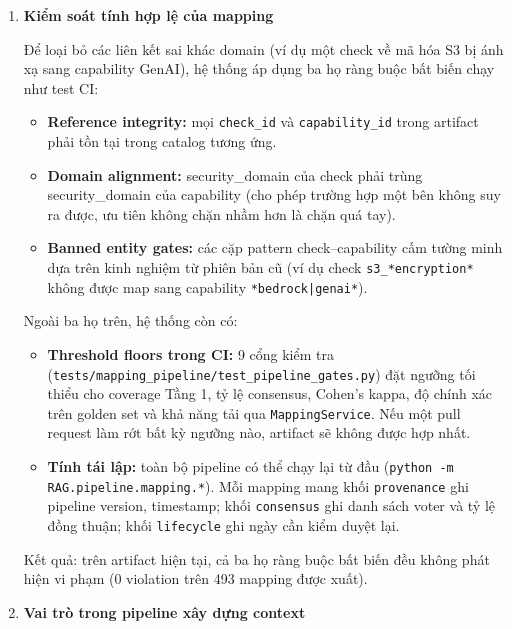 \begin{enumerate}
    Trong trường hợp tồn tại nhiều mapping, hệ thống có thể giữ lại một tập các ứng viên thay vì chỉ chọn một kết quả duy nhất, nhằm phục vụ các bước xây dựng ngữ cảnh phía sau.

    \item \textbf{Kiểm soát tính hợp lệ của mapping}

    Để loại bỏ các liên kết sai khác domain (ví dụ một check về mã hóa S3 bị ánh xạ sang capability GenAI), hệ thống áp dụng ba họ ràng buộc bất biến chạy như test CI:
    \begin{itemize}
        \item \textbf{Reference integrity:} mọi \texttt{check\_id} và \texttt{capability\_id} trong artifact phải tồn tại trong catalog tương ứng.
        \item \textbf{Domain alignment:} security\_domain của check phải trùng security\_domain của capability (cho phép trường hợp một bên không suy ra được, ưu tiên không chặn nhầm hơn là chặn quá tay).
        \item \textbf{Banned entity gates:} các cặp pattern check--capability cấm tường minh dựa trên kinh nghiệm từ phiên bản cũ (ví dụ check \texttt{s3\_*encryption*} không được map sang capability \texttt{*bedrock|genai*}).
    \end{itemize}

    Ngoài ba họ trên, hệ thống còn có:
    \begin{itemize}
        \item \textbf{Threshold floors trong CI:} 9 cổng kiểm tra (\texttt{tests/mapping\_pipeline/test\_pipeline\_gates.py}) đặt ngưỡng tối thiểu cho coverage Tầng 1, tỷ lệ consensus, Cohen's kappa, độ chính xác trên golden set và khả năng tải qua \texttt{MappingService}. Nếu một pull request làm rớt bất kỳ ngưỡng nào, artifact sẽ không được hợp nhất.
        \item \textbf{Tính tái lập:} toàn bộ pipeline có thể chạy lại từ đầu (\texttt{python -m RAG.pipeline.mapping.*}). Mỗi mapping mang khối \texttt{provenance} ghi pipeline version, timestamp; khối \texttt{consensus} ghi danh sách voter và tỷ lệ đồng thuận; khối \texttt{lifecycle} ghi ngày cần kiểm duyệt lại.
    \end{itemize}

    Kết quả: trên artifact hiện tại, cả ba họ ràng buộc bất biến đều không phát hiện vi phạm (0 violation trên 493 mapping được xuất).

    \item \textbf{Vai trò trong pipeline xây dựng context}


\end{enumerate}

